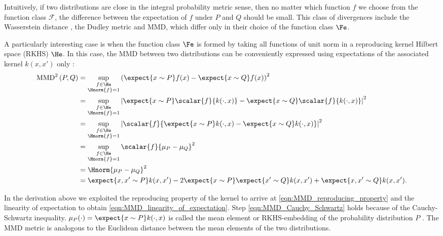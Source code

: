 Intuitively, if two distributions are close in the integral probability metric sense, then no matter which function $f$ we choose from the function class $\mathcal{F}$, the difference between the expectation of $f$ under $P$ and $Q$ should be small. This class of divergences include the Wasserstein distance \citep{Barrio1999}, the Dudley metric \citep{Dudley1974} and MMD, which differ only in their choice of the function class $\Fe$.

A particularly interesting case is when the function class $\Fe$ is formed by taking all functions of unit norm in a reproducing kernel Hilbert space (RKHS) $\He$. In this case, the MMD between two distributions can be conveniently expressed using expectations of the associated kernel $k(x, x')$ only \citep{Sriperumbudur2008}:
%
\begin{align}
\mbox{MMD}^2\left(P,Q\right) &= \sup_{\substack{f\in\He\\\Hnorm{f}=1}}\left( \expect{x\sim P} f(x) - \expect{x\sim Q} f(x) \right)^2\label{eqn:rkhs-mmd}\\
	&=  \sup_{\substack{f\in\He\\\Hnorm{f}=1}}\left\vert \expect{x\sim P}\scalar{f}{k(\cdot,x)} - \expect{x\sim Q} \scalar{f}{k(\cdot,x)} \right\vert^2\label{eqn:MMD_reproducing_property}\\
	&=  \sup_{\substack{f\in\He\\\Hnorm{f}=1}}\left\vert \scalar{f}{\expect{x\sim P} k(\cdot,x) - \expect{x\sim Q} k(\cdot,x)}\right\vert^2\label{eqn:MMD_linearity_of_expectation}\\
	&=  \sup_{\substack{f\in\He\\\Hnorm{f}=1}}\scalar{f}{\mu_{P} - \mu_{Q}}^2\\
	&=  \Hnorm{\mu_{P} - \mu_{Q}}^2\label{eqn:MMD_Cauchy_Schwartz}\\
	&=  \expect{x,x'\sim P} k(x,x')	- 2 \expect{x\sim P}\expect{x'\sim Q} k(x,x') + \expect{x,x'\sim Q} k(x,x').\label{eqn:rkhs-mmd-lastline}
\end{align}

In the derivation above we exploited the reproducing property of the kernel to arrive at \eqref{eqn:MMD_reproducing_property} and the linearity of expectation to obtain \eqref{eqn:MMD_linearity_of_expectation}. Step \eqref{eqn:MMD_Cauchy_Schwartz} holds because of the Cauchy-Schwartz inequality. $\mu_P(\cdot) = \expect{x\sim P} k(\cdot,x)$ is called the mean element or RKHS-embedding of the probability distribution $P$ \citep{Smola2007}. The MMD metric is analogous to the Euclidean distance between the mean elements of the two distributions.

